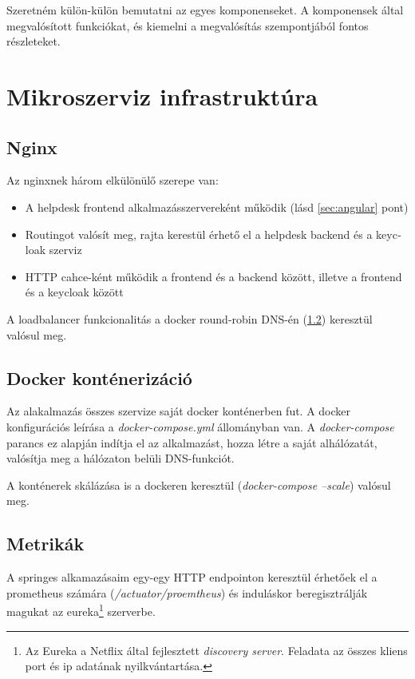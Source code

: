Szeretném külön-külön bemutatni az egyes komponenseket. A komponensek által megvalósított funkciókat, és kiemelni a megvalósítás szempontjából fontos részleteket. 

\section{Mikroszerviz infrastruktúra}
\subsection{Nginx}\label{sec:nginx}
Az nginxnek három elkülönülő szerepe van:

\begin{itemize}
	\item{A \foreignlanguage{british}{helpdesk frontend} alkalmazásszervereként működik (lásd \ref{sec:angular} pont)}
	
	\item{\foreignlanguage{british}{Routing}ot valósít meg, rajta kerestül érhető el a \foreignlanguage{british}{helpdesk backend} és a \foreignlanguage{british}{keycloak} szerviz}
	
	\item{\foreignlanguage{british}{HTTP cahce}-ként működik a frontend és a backend között, illetve a frontend és a keycloak között}
\end{itemize}

A loadbalancer funkcionalitás a \foreignlanguage{british}{docker round-robin DNS}-én (\ref{sec:docker}) keresztül valósul meg.


\subsection{Docker konténerizáció}\label{sec:docker}
Az alakalmazás összes szervize saját docker konténerben fut. A docker konfigurációs leírása a \textit{docker-compose.yml} állományban van. A \textit{docker-compose} parancs ez alapján indítja el az alkalmazást, hozza létre a saját alhálózatát, valósítja meg a hálózaton belüli DNS-funkciót.

A konténerek skálázása  is a dockeren keresztül (\textit{docker-compose --scale}) valósul meg.



\subsection{Metrikák}\label{sec:metrikak}
A springes alkamazásaim egy-egy HTTP endpointon keresztül érhetőek el a prometheus számára (\textit{\mbox{/actuator/proemtheus}}) és induláskor beregisztrálják magukat az eureka\footnote{Az Eureka a Netflix által fejlesztett \textit{discovery server}. Feladata az összes kliens port és ip adatának nyilkvántartása.} szerverbe.

